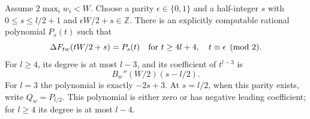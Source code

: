 \begin{lemma}\label{lem:centralpolynomials}
Assume $2\max_iw_i<W$. Choose a parity $\epsilon\in\{0,1\}$ and
a half-integer $s$ with $0\le s\le l/2+1$ and
$\epsilon W/2+s\in\mathbb Z$. There is an explicitly computable
rational polynomial $P_s(t)$ such that
\[
 \Delta F_{tw}(tW/2+s)=P_s(t)
 \quad\text{for }t\ge4l+4,\quad t\equiv\epsilon\pmod2.
\]
For $l\ge4$, its degree is at most $l-3$, and its coefficient of
$t^{l-3}$ is
\begin{equation}\label{eq:centralleading}
 B_w''(W/2)(s-l/2).
\end{equation}
For $l=3$ the polynomial is exactly $-2s+3$.
At $s=l/2$, when this parity exists, write $Q_w=P_{l/2}$.
This polynomial is either zero or has negative leading coefficient;
for $l\ge4$ its degree is at most $l-4$.
\end{lemma}
